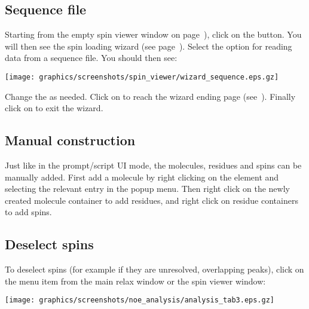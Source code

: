 
\subsection{Sequence file} \label{sect: GUI - sequence file}

Starting from the empty spin viewer window on page~\pageref{figure: spin viewer blank}), click on the  button.  You will then see the spin loading wizard (see page~\pageref{figure: spin viewer wizard start}).  Select the option for reading data from a sequence file.  You should then see:

\begin{minipage}[h]{\linewidth}
\centerline{\texttt{[image: graphics/screenshots/spin\_viewer/wizard\_sequence.eps.gz]}}
\end{minipage}

Change the  as needed.  Click on  to reach the wizard ending page (see~\pageref{figure: spin viewer end}).  Finally click on  to exit the wizard.



\subsection{Manual construction} \label{sect: GUI - manual construction}

Just like in the prompt/script UI mode, the molecules, residues and spins can be manually added.  First add a molecule by right clicking on the  element and selecting the relevant entry in the popup menu.  Then right click on the newly created molecule container to add residues, and right click on residue containers to add spins.



\subsection{Deselect spins} \label{sect: GUI - deselect spins}

To deselect spins (for example if they are unresolved, overlapping peaks), click on the  menu item from the main relax window or the spin viewer window:

\begin{minipage}[h]{\linewidth}
\centerline{\texttt{[image: graphics/screenshots/noe\_analysis/analysis\_tab3.eps.gz]}}
\end{minipage}

